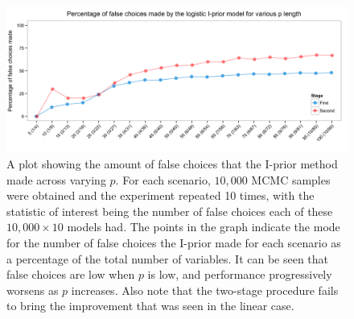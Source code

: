 \begin{figure}[h]
	\centering
	\includegraphics[width=5.8in]{figure/logsimiprior} \vspace{-7.5mm} 
	\caption{A plot showing the amount of false choices that the I-prior method made across varying $p$. For each scenario, $10,000$ MCMC samples were obtained and the experiment repeated 10 times, with the statistic of interest being the number of false choices each of these $10,000 \times 10$ models had. The points in the graph indicate the mode for the number of false choices the I-prior made for each scenario as a percentage of the total number of variables. It can be seen that false choices are low when $p$ is low, and performance progressively worsens as $p$ increases. Also note that the two-stage procedure fails to bring the improvement that was seen in the linear case. \label{fig:logsimiprior}}
\end{figure}
 